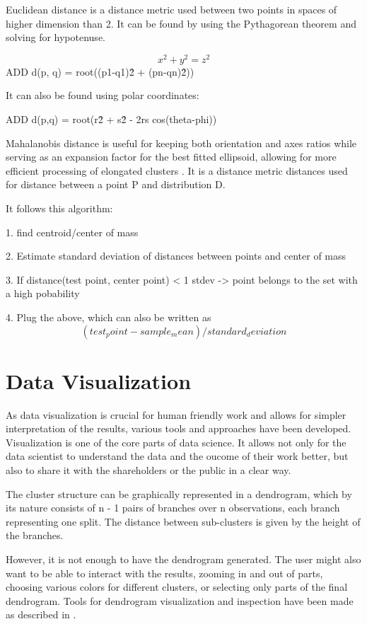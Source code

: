 Euclidean distance is a distance metric used between two points in spaces of higher dimension than 2. It can be found by using the Pythagorean theorem and solving for hypotenuse. 


 \[ x^2 + y^2= z^2 \]
 ADD d(p, q) = root((p1-q1)\^2 + (pn-qn)\^2))

 It can also be found using polar coordinates:

 ADD d(p,q) = root(r\^2 + s\^2 - 2rs cos(theta-phi)) 

Mahalanobis distance is useful for keeping both orientation and axes ratios while serving as an expansion factor for the best fitted ellipsoid, allowing for more efficient processing of elongated clusters \cite{zamir2005resolving}. It is a distance metric distances used for distance between a point P and distribution D. 

It follows this algorithm:

1. find centroid/center of mass

2. Estimate standard deviation of distances between points and center of mass

3. If distance(test point, center point) < 1 stdev -> point belongs to the set with a high pobability

4. Plug the above, which can also be written as 
\[(test_point - sample_mean)/standard_deviation\]


\section{Data Visualization}
\label{sec:dataviz}
As data visualization is crucial for human friendly work and allows for simpler interpretation of the results, various tools and approaches have been developed. Visualization is one of the core parts of data science. It allows not only for the data scientist to understand the data and the oucome of their work better, but also to share it with the shareholders or the public in a clear way.

The cluster structure can be graphically represented in a dendrogram, which by its nature consists of n - 1 pairs of branches over n observations, each branch representing one split. The distance between sub-clusters is given by the height of the branches. 

However, it is not enough to have the dendrogram generated. The user might also want to be able to interact with the results, zooming in and out of parts, choosing various colors for different clusters, or selecting only parts of the final dendrogram. Tools for dendrogram visualization and inspection have been made as described in \cite{sieger2017interactive}.

